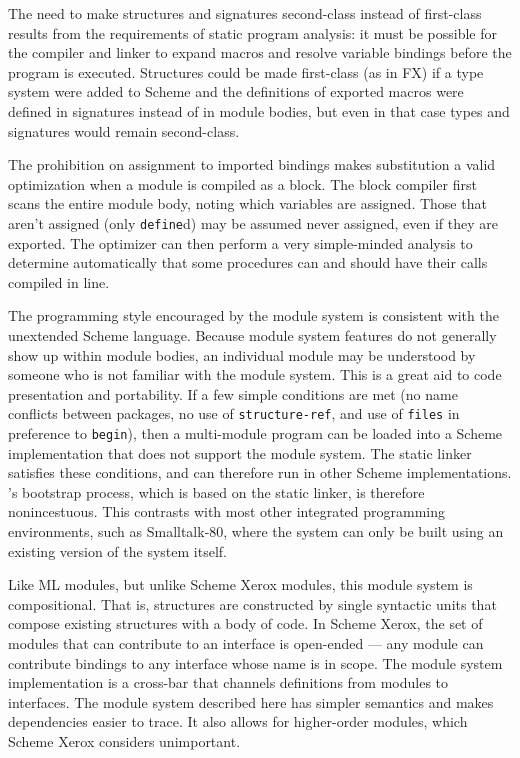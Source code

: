 The need to make structures and signatures second-class instead of
first-class results from the requirements of static program analysis:
it must be possible for the compiler and linker to expand macros and
resolve variable bindings before the program is executed.  Structures
could be made first-class (as in FX\cite{Sheldon-Gifford:Static}) if a
type system were added to Scheme and the definitions of exported
macros were defined in signatures instead of in module bodies, but
even in that case types and signatures would remain second-class.

The prohibition on assignment to imported bindings makes substitution
a valid optimization when a module is compiled as a block.  The block
compiler first scans the entire module body, noting which variables
are assigned.  Those that aren't assigned (only {\tt define}d) may be
assumed never assigned, even if they are exported.  The optimizer can
then perform a very simple-minded analysis to determine automatically
that some procedures can and should have their calls compiled in line.

The programming style encouraged by the module system is consistent
with the unextended Scheme language.  Because module system features
do not generally show up within module bodies, an individual module
may be understood by someone who is not familiar with the module
system.  This is a great aid to code presentation and portability.  If
a few simple conditions are met (no name conflicts between packages,
no use of {\tt structure-ref}, and use of {\tt files} in preference to
{\tt begin}), then a multi-module program can be loaded into a Scheme
implementation that does not support the module system.  The \hack{}
static linker satisfies these conditions, and can therefore run in
other Scheme implementations.  \hack{}'s bootstrap process, which is
based on the static linker, is therefore nonincestuous.  This
contrasts with most other integrated programming environments, such as
Smalltalk-80, where the system can only be built using an existing
version of the system itself.

Like ML modules, but unlike Scheme Xerox modules, this module system
is compositional.  That is, structures are constructed by single
syntactic units that compose existing structures with a body of code.
In Scheme Xerox, the set of modules that can contribute to an
interface is open-ended --- any module can contribute bindings to any
interface whose name is in scope.  The module system implementation is
a cross-bar that channels definitions from modules to interfaces.  The
module system described here has simpler semantics and makes
dependencies easier to trace.  It also allows for higher-order
modules, which Scheme Xerox considers unimportant.

